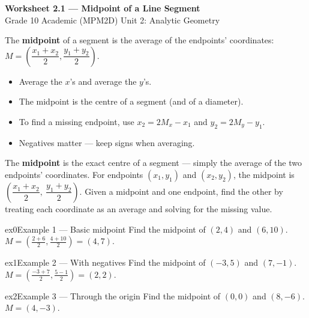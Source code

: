 \documentclass[11pt]{article}
\begin{document}
\begin{center}
{\LARGE\bfseries\color{titleblue}Worksheet 2.1 --- Midpoint of a Line Segment}\\[2pt]
{\small Grade 10 Academic (MPM2D) \textperiodcentered{} Unit 2: Analytic Geometry}
\end{center}

\begin{ideabox}
The \textbf{midpoint} of a segment is the average of the endpoints' coordinates: $M=\left(\dfrac{x_1+x_2}{2},\dfrac{y_1+y_2}{2}\right)$.
\begin{itemize}[leftmargin=*,itemsep=2pt]
  \item Average the $x$'s and average the $y$'s.
  \item The midpoint is the centre of a segment (and of a diameter).
  \item To find a missing endpoint, use $x_2=2M_x-x_1$ and $y_2=2M_y-y_1$.
  \item Negatives matter --- keep signs when averaging.
\end{itemize}
\end{ideabox}

\begin{learnbox}
The \textbf{midpoint} is the exact centre of a segment — simply the average of the two endpoints' coordinates.
For endpoints $(x_1,y_1)$ and $(x_2,y_2)$, the midpoint is $\left(\dfrac{x_1+x_2}{2},\ \dfrac{y_1+y_2}{2}\right)$.
Given a midpoint and one endpoint, find the other by treating each coordinate as an average and solving for the missing value.
\end{learnbox}


\begin{example}{ex0}{Example 1 --- Basic midpoint}
Find the midpoint of $(2,4)$ and $(6,10)$.
\soln $M=\left(\tfrac{2+6}{2},\tfrac{4+10}{2}\right)=(4,7).$
\end{example}

\begin{example}{ex1}{Example 2 --- With negatives}
Find the midpoint of $(-3,5)$ and $(7,-1)$.
\soln $M=\left(\tfrac{-3+7}{2},\tfrac{5-1}{2}\right)=(2,2).$
\end{example}

\begin{example}{ex2}{Example 3 --- Through the origin}
Find the midpoint of $(0,0)$ and $(8,-6)$.
\soln $M=(4,-3).$
\end{example}
\end{document}
